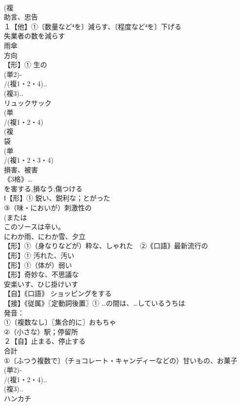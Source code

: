 \documentclass[8pt]{extreport}
\begin{document}
\begin{CJK}{UTF8}{min}
\\	(複
\\	助言、忠告 
\\	１【他】①〔数量など⁴を〕減らす、〔程度など⁴を〕下げる 
\\	失業者の数を減らす
\\	雨傘
\\	方向 
\\	【形】① 生の 
\\	(単2)‐
\\	/(複1・2・4)..
\\	(複3)..
\\	リュックサック
\\	(単
\\	/(複1・2・4)
\\	(複
\\	袋
\\	(単
\\	/(複1・2・3・4)
\\	損害、被害 
\\	《3格》…
\\	を害する,損なう,傷つける
\\	Ⅰ【形】① 鋭い、鋭利な；とがった 
\\	③（味・においが）刺激性の 
\\	(または
\\	このソースは辛い。
\\	にわか雨、にわか雪、夕立 
\\	【形】①（身なりなどが）粋な、しゃれた　②｟口語｠最新流行の　
\\	【形】① 汚れた、汚い 
\\	【形】①（体が）弱い 
\\	【形】奇妙な、不思議な 
\\	安楽いす、ひじ掛けいす 
\\	【自】｟口語｠ ショッピングをする 
\\	【接】《従属》〖定動詞後置〗① …の間は、…しているうちは 
\\	発音：
\\	①〔複数なし〕〖集合的に〗おもちゃ 
\\	②（小さな）駅；停留所
\\	２【自】止まる、停止する
\\	合計 
\\	①〔ふつう複数で〕（チョコレート・キャンディーなどの）甘いもの、お菓子
\\	(単2)‐
\\	/(複1・2・4)..
\\	(複3)..
\\	ハンカチ 

\end{CJK}
\end{document}
